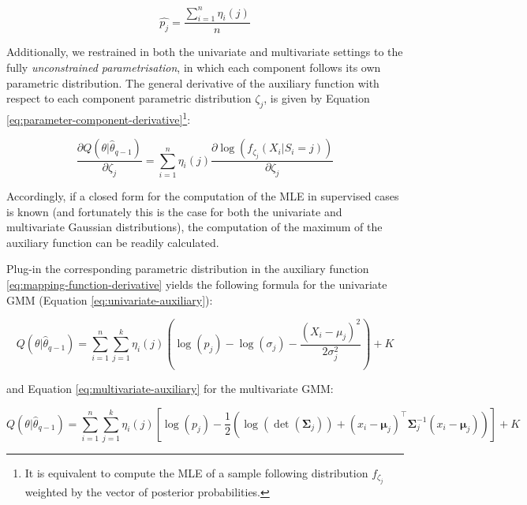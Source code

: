 \begin{equation}
\hat{p_j}= \frac{\sum_{i=1}^n \eta_{i}(j)}{n}
\label{eq:ratios-estimate}
\end{equation}

Additionally, we restrained in both the univariate and
multivariate settings to the fully \emph{unconstrained parametrisation}, in which each component follows its own parametric distribution. The general
derivative of the auxiliary function with respect to each
component parametric distribution \(\zeta_j\), is given by Equation
\eqref{eq:parameter-component-derivative}\footnote{It is equivalent to compute the MLE of a sample following distribution \(f_{\zeta_j}\) weighted by the vector of posterior probabilities.}:

\begin{equation}
\frac{\partial Q(\theta|\hat{\theta}_{q-1})}{\partial \zeta_j}=\sum_{i=1}^n  \eta_{i}(j) \frac{\partial \log (f_{\zeta_j}(X_i|S_i=j))}{\partial \zeta_j}
\label{eq:parameter-component-derivative}
\end{equation}

Accordingly, if a closed form for the computation of the MLE in
supervised cases is known (and fortunately this is the case for both the univariate and multivariate Gaussian distributions), the computation of the maximum of the auxiliary function can be readily calculated.

Plug-in the corresponding parametric distribution in the auxiliary function \eqref{eq:mapping-function-derivative} yields the following formula for the univariate GMM (Equation
\eqref{eq:univariate-auxiliary}):

\begin{equation}
Q(\theta| \hat{\theta}_{q-1}) = \sum_{i=1}^n \sum_{j=1}^k \eta_i(j) \left( \log (p_j) - \log (\sigma_j) - \frac{(X_i-\mu_j)^2}{2\sigma_j^2} \right) + K
\label{eq:univariate-auxiliary}
\end{equation}

and Equation \eqref{eq:multivariate-auxiliary} for the multivariate GMM:

\begin{equation}
Q(\theta| \hat{\theta}_{q-1}) = \sum_{i=1}^n \sum_{j=1}^k \eta_i(j) \left[ \log (p_j) - \frac{1}{2} \left( \log(\operatorname{det}(\boldsymbol{\Sigma}_j)) + (x_i - \boldsymbol{\mu}_j)^\top \boldsymbol{\Sigma}_j^{-1}(x_i - \boldsymbol{\mu}_j)\right) \right] + K
\label{eq:multivariate-auxiliary}
\end{equation}

